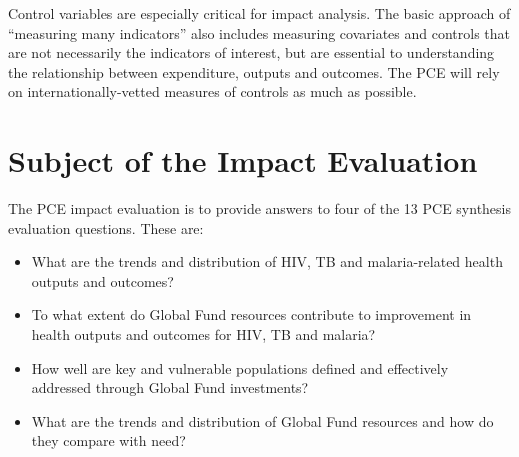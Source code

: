 \documentclass[twocolumn]{bmcart}%
\begin{document}
Control variables are especially critical for impact analysis. The basic approach of ``measuring many indicators'' also includes measuring covariates and controls that are not necessarily the indicators of interest, but are essential to understanding the relationship between expenditure, outputs and outcomes. The PCE will rely on internationally-vetted measures of controls as much as possible. \\










\section{Subject of the Impact Evaluation} \label{hypothesis}

The PCE impact evaluation is to provide answers to four of the 13 PCE synthesis evaluation questions. These are:
\begin{itemize}
  \item What are the trends and distribution of HIV, TB and malaria-related health outputs and outcomes?
  \item To what extent do Global Fund resources contribute to improvement in health outputs and outcomes for HIV, TB and malaria?
  \item How well are key and vulnerable populations defined and effectively addressed through Global Fund investments?
  \item What are the trends and distribution of Global Fund resources and how do they compare with need?
\end{itemize}
\end{document}
